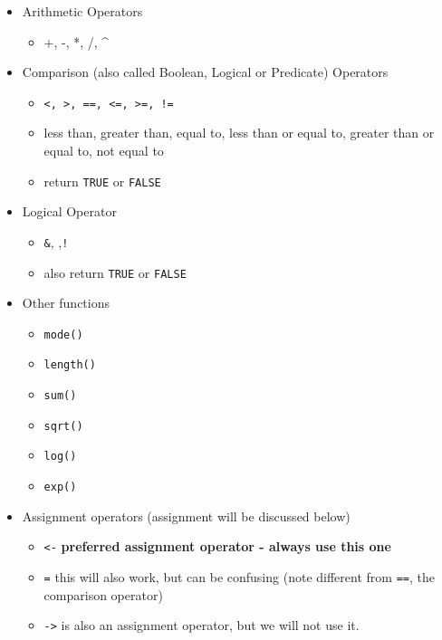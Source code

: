 \documentclass[
]{book}
\providecommand{\tightlist}{%
  \setlength{\itemsep}{0pt}\setlength{\parskip}{0pt}}
\begin{document}
\begin{itemize}
\tightlist
\item
  Arithmetic Operators

  \begin{itemize}
  \tightlist
  \item
    +, -, *, /, \^{}
  \end{itemize}
\item
  Comparison (also called Boolean, Logical or Predicate) Operators

  \begin{itemize}
  \tightlist
  \item
    \texttt{\textless{},\ \textgreater{},\ ==,\ \textless{}=,\ \textgreater{}=,\ !=}
  \item
    less than, greater than, equal to, less than or equal to, greater than or equal to, not equal to
  \item
    return \texttt{TRUE} or \texttt{FALSE}
  \end{itemize}
\item
  Logical Operator

  \begin{itemize}
  \tightlist
  \item
    \texttt{\&}, \texttt{\textbar{}} ,\texttt{!}
  \item
    also return \texttt{TRUE} or \texttt{FALSE}
  \end{itemize}
\item
  Other functions

  \begin{itemize}
  \tightlist
  \item
    \texttt{mode()}
  \item
    \texttt{length()}
  \item
    \texttt{sum()}
  \item
    \texttt{sqrt()}
  \item
    \texttt{log()}
  \item
    \texttt{exp()}
  \end{itemize}
\item
  Assignment operators (assignment will be discussed below)

  \begin{itemize}
  \tightlist
  \item
    \texttt{\textless{}-} \textbf{preferred assignment operator - always use this one}
  \item
    \texttt{=} this will also work, but can be confusing (note different from \texttt{==}, the comparison operator)
  \item
    \texttt{-\textgreater{}} is also an assignment operator, but we will not use it.
  \end{itemize}
\end{itemize}
\end{document}
